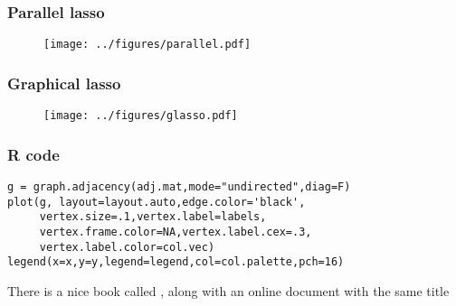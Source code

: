 \documentclass[12pt]{beamer}
\begin{document}
\begin{frame}[fragile]
\frametitle{Parallel lasso}
\begin{figure}
\centering
\texttt{[image: ../figures/parallel.pdf]}
\end{figure}
\end{frame}

\begin{frame}[fragile]
\frametitle{Graphical lasso}
\begin{figure}
\centering
\texttt{[image: ../figures/glasso.pdf]}
\end{figure}
\end{frame}


\begin{frame}[fragile]
\frametitle{R code}
\begin{verbatim}
g = graph.adjacency(adj.mat,mode="undirected",diag=F)
plot(g, layout=layout.auto,edge.color='black',
     vertex.size=.1,vertex.label=labels,
     vertex.frame.color=NA,vertex.label.cex=.3,
     vertex.label.color=col.vec)
legend(x=x,y=y,legend=legend,col=col.palette,pch=16)
\end{verbatim}

There is a nice book called , along with an online document
with the same title
\end{frame}
\end{document}
